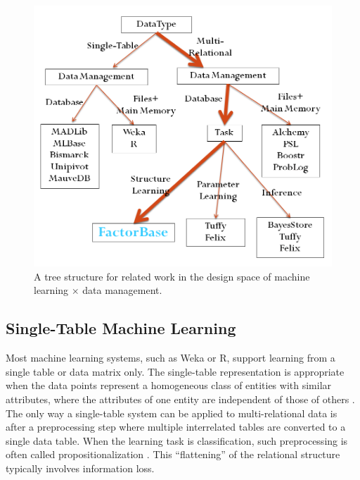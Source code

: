 \documentclass{sfuthesis}
\begin{document}
\begin{figure}[!h] %
 \centering
  \includegraphics[width=1\textwidth]{related-dt.png} 
\caption{A tree structure for related work in the design space of machine learning $\times$ data management.}
\label{fig:related}
\end{figure}

\subsection{Single-Table Machine Learning} 
Most machine learning systems, such as Weka or R, support learning from a single table or data matrix only. The single-table representation is appropriate when the data points represent a homogeneous class of entities with similar attributes, where the attributes of one entity are independent of those of others \cite{Kimmig2015}. The only way a single-table system can be applied to multi-relational data is after a preprocessing step where multiple interrelated tables are converted to a single data table. When the learning task is classification, such preprocessing is often called propositionalization  \cite{Kimmig2015}.  This ``flattening'' of the relational structure typically involves information loss.  
\end{document}
